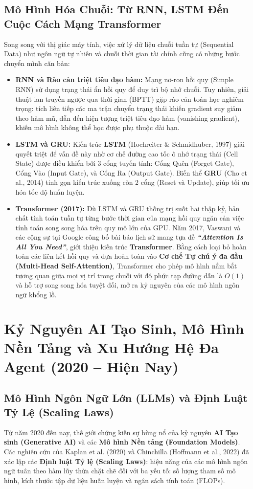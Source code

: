 \documentclass[12pt,a4paper]{report}
\begin{document}
\subsection{Mô Hình Hóa Chuỗi: Từ RNN, LSTM Đến Cuộc Cách Mạng Transformer}
Song song với thị giác máy tính, việc xử lý dữ liệu chuỗi tuần tự (Sequential Data) như ngôn ngữ tự nhiên và chuỗi thời gian tài chính cũng có những bước chuyển mình căn bản:
\begin{itemize}[leftmargin=1.2cm]
    \item \textbf{RNN và Rào cản triệt tiêu đạo hàm:} Mạng nơ-ron hồi quy (Simple RNN) sử dụng trạng thái ẩn hồi quy để duy trì bộ nhớ chuỗi. Tuy nhiên, giải thuật lan truyền ngược qua thời gian (BPTT) gặp rào cản toán học nghiêm trọng: tích liên tiếp các ma trận chuyển trạng thái khiến gradient suy giảm theo hàm mũ, dẫn đến hiện tượng triệt tiêu đạo hàm (vanishing gradient), khiến mô hình không thể học được phụ thuộc dài hạn.
    \item \textbf{LSTM và GRU:} Kiến trúc \textbf{LSTM} (Hochreiter \& Schmidhuber, 1997) giải quyết triệt để vấn đề này nhờ cơ chế đường cao tốc ô nhớ trạng thái (Cell State) được điều khiển bởi 3 cổng tuyến tính: Cổng Quên (Forget Gate), Cổng Vào (Input Gate), và Cổng Ra (Output Gate). Biến thể \textbf{GRU} (Cho et al., 2014) tinh gọn kiến trúc xuống còn 2 cổng (Reset và Update), giúp tối ưu hóa tốc độ huấn luyện.
    \item \textbf{Transformer (2017):} Dù LSTM và GRU thống trị suốt hai thập kỷ, bản chất tính toán tuần tự từng bước thời gian của mạng hồi quy ngăn cản việc tính toán song song hóa trên quy mô lớn của GPU. Năm 2017, Vaswani và các cộng sự tại Google công bố bài báo lịch sử mang tựa đề \textbf{\textit{“Attention Is All You Need”}}, giới thiệu kiến trúc \textbf{Transformer}. Bằng cách loại bỏ hoàn toàn các liên kết hồi quy và dựa hoàn toàn vào \textbf{Cơ chế Tự chú ý đa đầu (Multi-Head Self-Attention)}, Transformer cho phép mô hình nắm bắt tương quan giữa mọi vị trí trong chuỗi với độ phức tạp đường dẫn là $O(1)$ và hỗ trợ song song hóa tuyệt đối, mở ra kỷ nguyên của các mô hình ngôn ngữ khổng lồ.
\end{itemize}

\section{Kỷ Nguyên AI Tạo Sinh, Mô Hình Nền Tảng và Xu Hướng Hệ Đa Agent (2020 -- Hiện Nay)}

\subsection{Mô Hình Ngôn Ngữ Lớn (LLMs) và Định Luật Tỷ Lệ (Scaling Laws)}
Từ năm 2020 đến nay, thế giới chứng kiến sự bùng nổ của kỷ nguyên \textbf{AI Tạo sinh (Generative AI)} và các \textbf{Mô hình Nền tảng (Foundation Models)}. Các nghiên cứu của Kaplan et al. (2020) và Chinchilla (Hoffmann et al., 2022) đã xác lập các \textbf{Định luật Tỷ lệ (Scaling Laws)}: hiệu năng của các mô hình ngôn ngữ tuân theo hàm lũy thừa chặt chẽ đối với ba yếu tố: số lượng tham số mô hình, kích thước tập dữ liệu huấn luyện và ngân sách tính toán (FLOPs).
\end{document}
